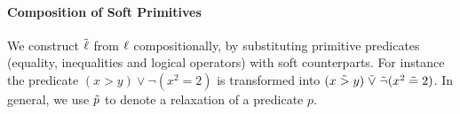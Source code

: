 


\paragraph{Composition of Soft Primitives} We construct $\mathrel{\tilde{\operatorname{\ell}}}$ from $\operatorname{\ell}$ compositionally, by substituting primitive predicates (equality, inequalities and logical operators) with soft counterparts.
For instance the predicate $(x > y) \lor \neg(x^2 = 2)$ is transformed into $(x \mathrel{\tilde{>}} y) \mathrel{\tilde{\lor}} \tilde{\neg}(x^2 \mathrel{\tilde{=}} 2)$.
In general, we use $\mathrel{\tilde{p}}$ to denote a relaxation of a predicate $p$.

